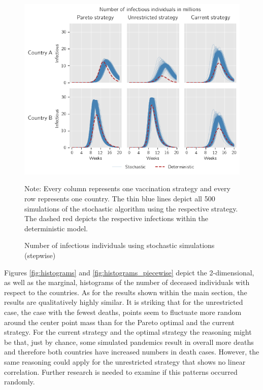 \begin{figure}[h!]
\centering
\includegraphics[scale=0.75]{images/piecewise_stochastic_infectious.png}\\
\begin{flushleft}
\scriptsize{Note:} Every column represents one vaccination strategy and every row represents one country. The thin blue lines depict all 500 simulations of the stochastic algorithm using the respective strategy. The dashed red depicts the respective infections within the deterministic model. 
\end{flushleft}
\caption{Number of infectious individuals using stochastic simulations (stepwise)}
\label{fig:results_piecewise_infectious_dead_stochastic}
\end{figure}
\newpage
Figures \ref{fig:histograms}  and \ref{fig:histograms_piecewise} depict the 2-dimensional, as well as the marginal, histograms of the number of deceased individuals with respect to the countries. As for the results shown within the main section, the results are qualitatively highly similar. It is striking that for the unrestricted case, the case with the fewest deaths, points seem to fluctuate more random around the center point mass than for the Pareto optimal and the current strategy. For the current strategy and the optimal strategy the reasoning might be that, just by chance, some simulated pandemics result in overall more deaths and therefore both countries have increased numbers in death cases. However, the same reasoning could apply for the unrestricted strategy that shows no linear correlation.
Further research is needed to examine if this patterns occurred randomly.
